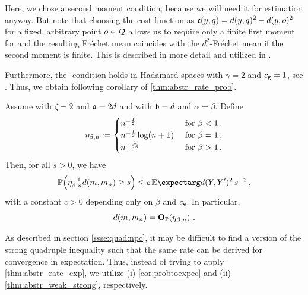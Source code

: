 Here, we chose a second moment condition, because we will need it for estimation anyway. But note that choosing the cost function as $\mathfrak{c}(y,q) = d(y,q)^2 - d(y,o)^2$ for a fixed, arbitrary point $o\in\mathcal{Q}$ allows us to require only a finite first moment for  and the resulting Fréchet mean coincides with the $d^2$-Fréchet mean if the second moment is finite. This is described in more detail and utilized in \cite{sturm03}.

Furthermore, the -condition holds in Hadamard spaces with $\gamma=2$ and $c_{\mathsf{g}} = 1$, see \cite[Proposition 4.4]{sturm03}.
%
Thus, we obtain following corollary of \autoref{thm:abstr_rate_prob}.
%
\begin{corollary}
	Assume  with $\zeta = 2$ and $\mathfrak{a} = 2d$ and   with $\mathfrak{b} = d$ and $\alpha=\beta$.
	Define
	\begin{equation*}
		\eta_{\beta,n} := 
		\begin{cases} 
			n^{-\frac12} & \text{ for }\beta < 1\, ,\\
			n^{-\frac12} \log(n+1) & \text{ for } \beta = 1\, ,\\
			n^{-\frac1{2\beta}} & \text{ for } \beta > 1\, .
		\end{cases} 
	\end{equation*}
	Then, for all $s > 0$, we have
	\begin{equation*}
		\PrOf{\eta_{\beta,n}^{-1} d(m,m_n) \geq s} \leq c \,\Ex{d(Y,Y\pr)^2} \,s^{-2}
		\eqcm
	\end{equation*}
	with a constant $c > 0$ depending only on $\beta$ and $c_{\mathsf{e}}$.
	In particular,
	\begin{equation*}
		d(m, m_n) = \mathbf{O}_{\mathbb{P}}\!\left( \eta_{\beta,n} \right)
		\, .
	\end{equation*}
\end{corollary}
%
As described in section \ref{ssse:quad:npc}, it may be difficult to find a version of the strong quadruple inequality such that the same rate can be derived for convergence in expectation. Thus, instead of trying to apply \autoref{thm:abstr_rate_exp}, we utilize (i) \autoref{cor:probtoexpec} and (ii) \autoref{thm:abstr_weak_strong}, respectively.
%
